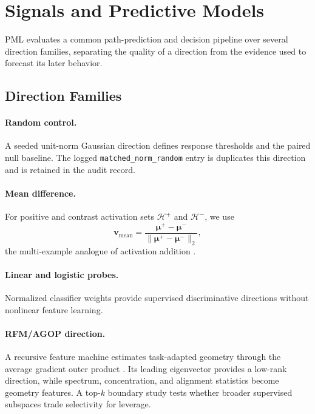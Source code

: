 \section{Signals and Predictive Models}

PML evaluates a common path-prediction and decision pipeline over several
direction families, separating the quality of a direction from the evidence
used to forecast its later behavior.

\subsection{Direction Families}

\paragraph{Random control.}
A seeded unit-norm Gaussian direction defines response thresholds and the
paired null baseline. The logged \texttt{matched\_norm\_random} entry is
duplicates this direction and is retained in the audit record.

\paragraph{Mean difference.}
For positive and contrast activation sets $\mathcal{H}^+$ and
$\mathcal{H}^-$, we use
\begin{equation}
    \mathbf{v}_{\mathrm{mean}}=
    \frac{\boldsymbol{\mu}^+-\boldsymbol{\mu}^-}
    {\|\boldsymbol{\mu}^+-\boldsymbol{\mu}^-\|_2},
\end{equation}
the multi-example analogue of activation addition
\citep{turner2023steering,rimsky-etal-2024-steering}.

\paragraph{Linear and logistic probes.}
Normalized classifier weights provide supervised discriminative directions
without nonlinear feature learning.

\paragraph{RFM/AGOP direction.}
A recursive feature machine estimates task-adapted geometry through the average
gradient outer product \citep{radhakrishnan2022mechanism}. Its leading
eigenvector provides a low-rank direction, while spectrum, concentration, and
alignment statistics become geometry features. A top-$k$ boundary study tests
whether broader supervised subspaces trade selectivity for leverage.

